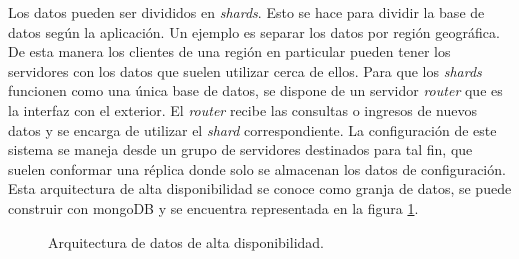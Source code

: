 Los datos pueden ser divididos en \emph{shards}.
Esto se hace para dividir la base de datos según la aplicación.
Un ejemplo es separar los datos por región geográfica.
De esta manera los clientes de una región en particular pueden tener los servidores con los datos que suelen utilizar cerca de ellos.
Para que los \emph{shards} funcionen como una única base de datos, se dispone de un servidor \emph{router} que es la interfaz con el exterior.
El \emph{router} recibe las consultas o ingresos de nuevos datos y se encarga de utilizar el \emph{shard} correspondiente.
La configuración de este sistema se maneja desde un grupo de servidores destinados para tal fin, que suelen conformar una réplica donde solo se almacenan los datos de configuración.
Esta arquitectura de alta disponibilidad se conoce como granja de datos, se puede construir con mongoDB \citep{WEBSITE:mongodbSharding} y se encuentra representada en la figura \ref{fig:ch1DatosAltaDisponibilidad}.

\begin{figure}[h]
	\centering
	\caption{Arquitectura de datos de alta disponibilidad.}
	\label{fig:ch1DatosAltaDisponibilidad}
\end{figure}

